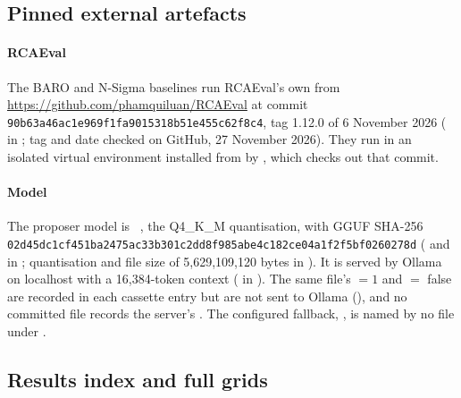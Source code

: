 \subsection{Pinned external artefacts}
\label{sec:app-pins}

\paragraph{RCAEval}
The BARO and N-Sigma baselines run RCAEval's own  from \url{https://github.com/phamquiluan/RCAEval} at commit \texttt{90b63a46\allowbreak ac1e969f\allowbreak 1fa90153\allowbreak 18b51e45\allowbreak 5c62f8c4}, tag 1.12.0 of 6 November 2026 ( in ; tag and date checked on GitHub, 27 November 2026).
They run in an isolated virtual environment installed from  by , which checks out that commit.

\paragraph{Model}
The proposer model is ~\cite{qwen35card}, the Q4\_K\_M quantisation, with GGUF SHA-256 \texttt{02d45dc1\allowbreak cf451ba2\allowbreak 475ac33b\allowbreak 301c2dd8\allowbreak f985abe4\allowbreak c182ce04\allowbreak a1f2f5bf\allowbreak 0260278d} ( and  in ; quantisation and file size of 5,629,109,120 bytes in ).
It is served by Ollama on localhost with a 16,384-token context ( in ).
The same file's  $= 1$ and  $=$ false are recorded in each cassette entry but are not sent to Ollama (), and no committed file records the server's .
The configured fallback, , is named by no file under .

\subsection{Results index and full grids}
\label{sec:app-index}

